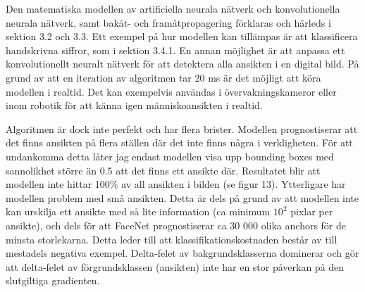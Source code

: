 \documentclass[a4paper,11pt,twoside]{article}
\begin{document}
Den matematiska modellen av artificiella neurala nätverk och konvolutionella neurala nätverk, samt bakåt- och framåtpropagering förklaras och härleds i sektion 3.2 och 3.3. Ett exempel på hur modellen kan tillämpas är att klassificera handskrivna siffror, som i sektion 3.4.1. 
En annan möjlighet är att anpassa ett konvolutionellt neuralt nätverk för att detektera alla ansikten i en digital bild. På grund av att en iteration av algoritmen tar 20 ms är det möjligt att köra modellen i realtid. Det kan exempelvis användas i övervakningskameror eller inom robotik för att känna igen människoansikten i realtid. 

Algoritmen är dock inte perfekt och har flera brister. Modellen prognostiserar att det finns ansikten på flera ställen där det inte finns några i verkligheten. För att undankomma detta låter jag endast modellen visa upp bounding boxes med sannolikhet större än 0.5 att det finns ett ansikte där. Resultatet blir att modellen inte hittar 100\% av all ansikten i bilden (se figur 13). Ytterligare har modellen problem med små ansikten. Detta är dels på grund av att modellen inte kan urskilja ett ansikte med så lite information (ca minimum $10^2$ pixlar per ansikte), och dels för att FaceNet prognostiserar ca 30 000 olika anchors för de minsta storlekarna. Detta leder till att klassifikationskostnaden består av till mestadels negativa exempel. Delta-felet av bakgrundsklasserna dominerar och gör att delta-felet av förgrundsklassen (ansikten) inte har en stor påverkan på den slutgiltiga gradienten.
\end{document}
